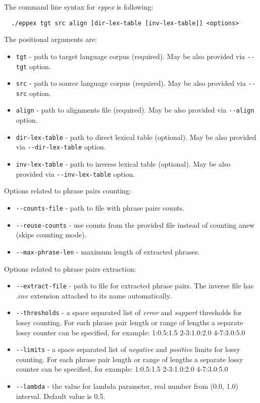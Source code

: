 The command line syntax for \emph{eppex} is following:

\begin{verbatim}
  ./eppex tgt src align [dir-lex-table [inv-lex-table]] <options>
\end{verbatim}

The positional arguments are:
\begin{itemize}
 \item \verb|tgt| - path to target language corpus (required).
  May be also provided via \verb|--tgt| option.
 \item \verb|src| - path to source language corpus (required).
  May be also provided via \verb|--src| option.
 \item \verb|align| - path to alignments file (required).
  May be also provided via \verb|--align| option.
 \item \verb|dir-lex-table| - path to direct lexical table (optional).
  May be also provided via \verb|--dir-lex-table| option. 
 \item \verb|inv-lex-table| - path to inverse lexical table (optional).
  May be also provided via \verb|--inv-lex-table| option. 
\end{itemize}

Options related to phrase pairs counting:
\begin{itemize}
 \item \verb|--counts-file| - path to file with phrase pairs counts.
 \item \verb|--reuse-counts| - use counts from the provided file instead
  of counting anew (skips counting mode).
 \item \verb|--max-phrase-len| - maximum length of extracted phrases.
\end{itemize}

Options related to phrase pairs extraction:
\begin{itemize}
 \item \verb|--extract-file| - path to file for extracted phrase pairs.
  The inverse file has $.inv$ extension attached to its name automatically.
 \item \verb|--thresholds| - a space separated list of \emph{error} and \emph{support}
  thresholds for lossy counting. For each phrase pair length or range of lengths a separate lossy counter
  can be specified, for example: 1:0.5:1.5 2-3:1.0:2.0 4-7:3.0:5.0
 \item \verb|--limits| - a space separated list of \emph{negative} and \emph{positive}
  limits for lossy counting. For each phrase pair length or range of lengths a separate lossy counter
  can be specified, for example: 1:0.5:1.5 2-3:1.0:2.0 4-7:3.0:5.0
 \item \verb|--lambda| - the value for lambda parameter, real number from
  (0.0, 1.0) interval. Default value is 0.5.
\end{itemize}

